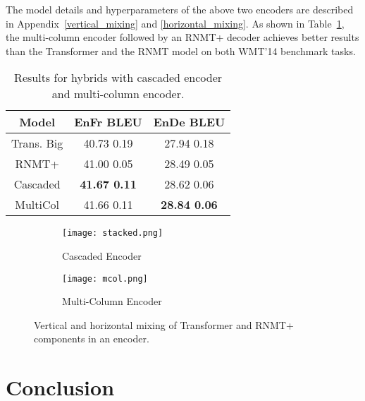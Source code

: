 \documentclass[11pt,a4paper]{article}
\begin{document}
The model details and hyperparameters
of the above two encoders are described in
Appendix~\ref{vertical_mixing} and \ref{horizontal_mixing}. As shown
in Table~\ref{table:hybrids-perf}, the multi-column encoder followed
by an RNMT+ decoder achieves better results than the
Transformer and the RNMT model on both WMT'14 benchmark tasks.


\begin{table}[!htbp]
\centering
\begin{tabular}{ c|c|c}
 \hline
 \hline
Model & EnFr BLEU & EnDe  BLEU\\ \hline
Trans. Big    & 40.73  0.19 & 27.94  0.18   \\
RNMT+     & 41.00  0.05  & 28.49   0.05  \\
Cascaded & \textbf{41.67  0.11} & 28.62  0.06\\
 MultiCol & 41.66  0.11 & \textbf{28.84  0.06}\\
 \hline
\end{tabular}
\caption{Results for hybrids with cascaded encoder and multi-column encoder.}
\label{table:hybrids-perf}
\end{table}












\begin{figure}
\begin{subfigure}{.25\textwidth}
  \centering
  \texttt{[image: stacked.png]}
  \caption{Cascaded Encoder}
  \label{fig:stacked}
\end{subfigure}\begin{subfigure}{.25\textwidth}
  \centering
  \texttt{[image: mcol.png]}
  \caption{Multi-Column Encoder}
  \label{fig:mcol}
\end{subfigure}
\caption{Vertical and horizontal mixing of Transformer and RNMT+ components in an encoder.}
\label{fig:enc_hybrids}
\end{figure}












\vspace{-5px}
\section{Conclusion}
\label{sec:conclusion}
\vspace{-5px}
\end{document}
